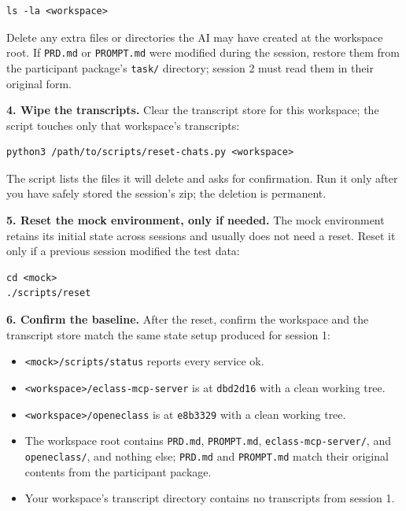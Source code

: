 \documentclass[11pt, a4paper]{article}
\begin{document}
\begin{verbatim}
ls -la <workspace>
\end{verbatim}

Delete any extra files or directories the AI may have created at the workspace root. If \texttt{PRD.md} or \texttt{PROMPT.md} were modified during the session, restore them from the participant package's \texttt{task/} directory; session 2 must read them in their original form.

\textbf{4. Wipe the transcripts.} Clear the transcript store for this workspace; the script touches only that workspace's transcripts:

\begin{verbatim}
python3 /path/to/scripts/reset-chats.py <workspace>
\end{verbatim}

The script lists the files it will delete and asks for confirmation. Run it only after you have safely stored the session's zip; the deletion is permanent.

\textbf{5. Reset the mock environment, only if needed.} The mock environment retains its initial state across sessions and usually does not need a reset. Reset it only if a previous session modified the test data:

\begin{verbatim}
cd <mock>
./scripts/reset
\end{verbatim}

\textbf{6. Confirm the baseline.} After the reset, confirm the workspace and the transcript store match the same state setup produced for session 1:

\begin{itemize}
    \item \texttt{<mock>/scripts/status} reports every service ok.
    \item \texttt{<workspace>/eclass-mcp-server} is at \texttt{dbd2d16} with a clean working tree.
    \item \texttt{<workspace>/openeclass} is at \texttt{e8b3329} with a clean working tree.
    \item The workspace root contains \texttt{PRD.md}, \texttt{PROMPT.md}, \texttt{eclass-mcp-server/}, and \texttt{openeclass/}, and nothing else; \texttt{PRD.md} and \texttt{PROMPT.md} match their original contents from the participant package.
    \item Your workspace's transcript directory contains no transcripts from session 1.
\end{itemize}
\end{document}

